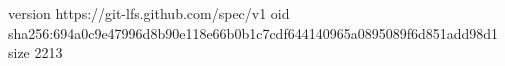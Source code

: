 version https://git-lfs.github.com/spec/v1
oid sha256:694a0c9e47996d8b90e118e66b0b1c7cdf644140965a0895089f6d851add98d1
size 2213

